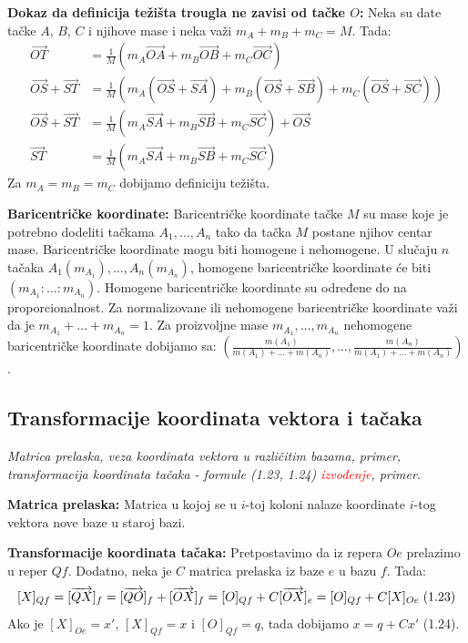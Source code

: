 \documentclass[12pt]{article}
\newcommand{\vek}[1]{\overrightarrow{#1}}
\newcommand{\ocena}[1]{\textcolor{red}{#1}}
\begin{document}
\textbf{Dokaz da definicija težišta trougla ne zavisi od tačke $O$:} Neka su
date tačke $A$, $B$, $C$ i njihove mase i neka važi $m_{A}+m_{B}+m_{C}=M$.
Tada:
\begin{align*}
    \vek{OT}          & =\frac{1}{M}(m_{A}\vek{OA}+m_{B}\vek{OB}
    +m_{C}\vek{OC})                                              \\
    \vek{OS}+\vek{ST} & =\frac{1}{M}(m_{A}(\vek{OS}+\vek{SA})
    +m_{B}(\vek{OS}+\vek{SB})+m_{C}(\vek{OS}+\vek{SC}))          \\
    \vek{OS}+\vek{ST} & =\frac{1}{M}(m_{A}\vek{SA}+m_{B}\vek{SB}
    +m_{C}\vek{SC})+\vek{OS}                                     \\
    \vek{ST}          & =\frac{1}{M}(m_{A}\vek{SA}+m_{B}\vek{SB}
    +m_{C}\vek{SC})
\end{align*}
Za $m_{A}=m_{B}=m_{C}$ dobijamo definiciju težišta.
\par

\textbf{Baricentričke koordinate:} Baricentričke koordinate tačke $M$ su mase
koje je potrebno dodeliti tačkama $A_1,\dotsc,A_n$ tako da tačka $M$ postane
njihov centar mase. Baricentričke koordinate mogu biti homogene i nehomogene.
U slučaju $n$ tačaka $A_1(m_{A_1}),\dotsc,A_n(m_{A_n})$, homogene
baricentričke koordinate će biti $(m_{A_1}:\dotsc:m_{A_n})$. Homogene
baricentričke koordinate su određene do na proporcionalnost. Za normalizovane
ili nehomogene baricentričke koordinate važi da je $m_{A_1}+\dotsc+m_{A_n}=1$.
Za proizvoljne mase $m_{A_1},\dotsc,m_{A_n}$ nehomogene baricentričke
koordinate dobijamo sa: $(\frac{m(A_1)}{m(A_1)+\dotsc+m(A_n)},\dotsc,
    \frac{m(A_n)}{m(A_1)+\dotsc+m(A_n)})$.

\subsection{Transformacije koordinata vektora i tačaka}
\textit{Matrica prelaska, veza koordinata vektora u različitim bazama,
    primer, transformacija koordinata tačaka - formule (1.23, 1.24)
    \ocena{izvođenje}, primer.}
\par
\vspace*{1cm}

\textbf{Matrica prelaska:} Matrica u kojoj se u $i$-toj koloni nalaze
koordinate $i$-tog vektora nove baze u staroj bazi.
\par

\textbf{Transformacije koordinata tačaka:} Pretpostavimo da iz repera $Oe$
prelazimo u reper $Qf$. Dodatno, neka je $C$ matrica prelaska iz baze $e$ u
bazu $f$. Tada:
$$[X]_{Qf}=[\vek{QX}]_f=[\vek{QO}]_f+[\vek{OX}]_f=[O]_{Qf}+C[\vek{OX}]_e
    =[O]_{Qf}+C[X]_{Oe}\hspace*{0.1cm}\text{(1.23)}$$
Ako je $[X]_{Oe}=x'$, $[X]_{Qf}=x$ i $[O]_{Qf}=q$, tada dobijamo $x=q+Cx'$
(1.24).
\end{document}
